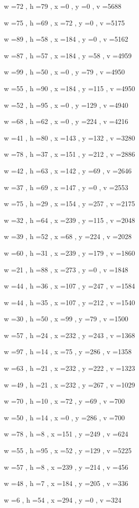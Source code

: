 \documentclass[11pt]{article}
\begin{document}
w =72 , h =79 , x =0 , y =0 , v =5688
\par
w =75 , h =69 , x =72 , y =0 , v =5175
\par
w =89 , h =58 , x =184 , y =0 , v =5162
\par
w =87 , h =57 , x =184 , y =58 , v =4959
\par
w =99 , h =50 , x =0 , y =79 , v =4950
\par
w =55 , h =90 , x =184 , y =115 , v =4950
\par
w =52 , h =95 , x =0 , y =129 , v =4940
\par
w =68 , h =62 , x =0 , y =224 , v =4216
\par
w =41 , h =80 , x =143 , y =132 , v =3280
\par
w =78 , h =37 , x =151 , y =212 , v =2886
\par
w =42 , h =63 , x =142 , y =69 , v =2646
\par
w =37 , h =69 , x =147 , y =0 , v =2553
\par
w =75 , h =29 , x =154 , y =257 , v =2175
\par
w =32 , h =64 , x =239 , y =115 , v =2048
\par
w =39 , h =52 , x =68 , y =224 , v =2028
\par
w =60 , h =31 , x =239 , y =179 , v =1860
\par
w =21 , h =88 , x =273 , y =0 , v =1848
\par
w =44 , h =36 , x =107 , y =247 , v =1584
\par
w =44 , h =35 , x =107 , y =212 , v =1540
\par
w =30 , h =50 , x =99 , y =79 , v =1500
\par
w =57 , h =24 , x =232 , y =243 , v =1368
\par
w =97 , h =14 , x =75 , y =286 , v =1358
\par
w =63 , h =21 , x =232 , y =222 , v =1323
\par
w =49 , h =21 , x =232 , y =267 , v =1029
\par
w =70 , h =10 , x =72 , y =69 , v =700
\par
w =50 , h =14 , x =0 , y =286 , v =700
\par
w =78 , h =8 , x =151 , y =249 , v =624
\par
w =55 , h =95 , x =52 , y =129 , v =5225
\par
w =57 , h =8 , x =239 , y =214 , v =456
\par
w =48 , h =7 , x =184 , y =205 , v =336
\par
w =6 , h =54 , x =294 , y =0 , v =324
\end{document}
